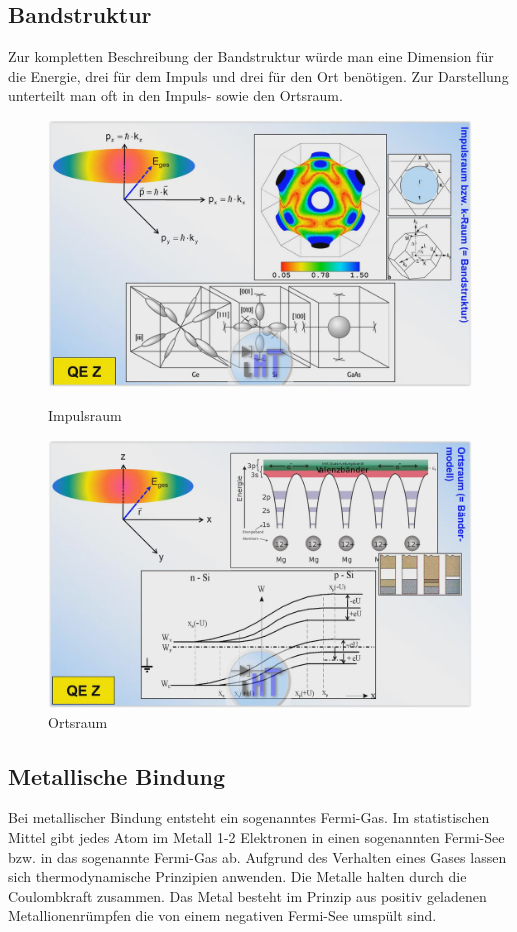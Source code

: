 \documentclass[12pt,a4paper]{report}%
\numberwithin{equation}{section}
\numberwithin{equation}{subsection}
\begin{document}
		\subsection{Bandstruktur}
		Zur kompletten Beschreibung der Bandstruktur würde man eine Dimension für die Energie, drei für dem Impuls und drei für den Ort benötigen. Zur Darstellung unterteilt man oft in den Impuls- sowie den Ortsraum.
		\begin{figure}[H] 
		\centering
		\begin{minipage}{.5\textwidth}
		  \centering
		  \captionsetup{justification=centering}
		  \includegraphics[width=0.8\linewidth]{bandstruktur_impulsraum.png}
		  \caption{Impulsraum \protect\cite{MIKRO2}}
		  \label{fig:bandstr_impulsraum}
		\end{minipage}%
		\begin{minipage}{.5\textwidth}
		  \centering
		  \captionsetup{justification=centering}
		  \includegraphics[width=0.8\linewidth]{bandstruktur_ortsraum.png}
		  \caption{Ortsraum \protect\cite{MIKRO2}}
		  \label{fig:bandstr_ortsraum}
		\end{minipage}
  \end{figure}
  
		\subsection{Metallische Bindung}
		Bei metallischer Bindung entsteht ein sogenanntes Fermi-Gas. Im statistischen Mittel gibt jedes Atom im Metall 1-2 Elektronen in einen sogenannten Fermi-See bzw. in das sogenannte Fermi-Gas ab. Aufgrund des Verhalten eines Gases lassen sich thermodynamische Prinzipien anwenden. Die Metalle halten durch die Coulombkraft zusammen. Das Metal besteht im Prinzip aus positiv geladenen Metallionenrümpfen die von einem negativen Fermi-See umspült sind.
		
\end{document}
